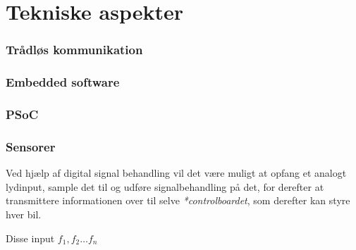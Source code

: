 \section{Tekniske aspekter}
\subsubsection{Trådløs kommunikation}
\subsubsection{Embedded software}
\subsubsection{PSoC}
\subsubsection{Sensorer}
Ved hjælp af digital signal behandling vil det være muligt at opfang et analogt lydinput, sample det til og udføre signalbehandling på det, for derefter at transmittere informationen over til selve \emph{*controlboardet}, som derefter kan styre hver bil.  

Disse input \(f_1, f_2 \dots f_n\)